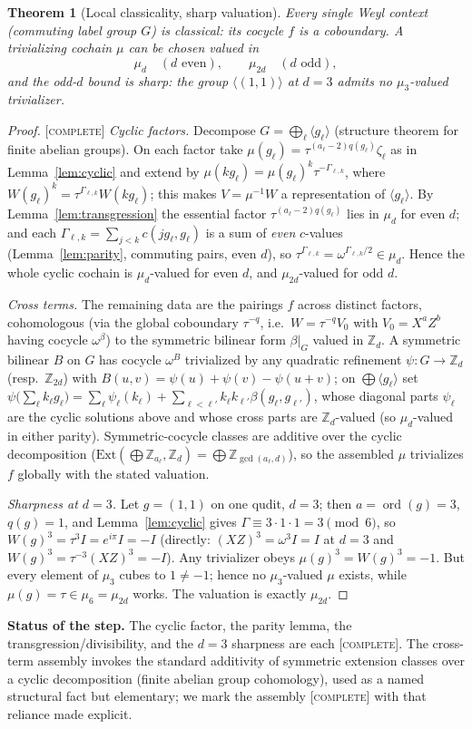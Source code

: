 \documentclass[11pt]{article}
\newtheorem{theorem}{Theorem}
\theoremstyle{definition}
\theoremstyle{remark}
\newcommand{\Z}{\mathbb{Z}}
\newcommand{\Zd}{\Z_d}
\DeclareMathOperator{\ord}{ord}
\newcommand{\CO}{\textnormal{\textsc{[complete]}}}
\newcommand{\flag}[1]{\par\smallskip\noindent\textbf{Status of the step.} #1\par\smallskip}
\begin{document}
\begin{theorem}[Local classicality, sharp valuation]\label{thm:local}
Every single Weyl context (commuting label group $G$) is classical: its cocycle $f$ is a coboundary.
A trivializing cochain $\mu$ can be chosen valued in
\[
\mu_d\quad(d\text{ even}),\qquad\mu_{2d}\quad(d\text{ odd}),
\]
and the odd-$d$ bound is sharp: the group $\langle(1,1)\rangle$ at $d=3$ admits no $\mu_3$-valued
trivializer.
\end{theorem}
\begin{proof}
\CO{} \emph{Cyclic factors.} Decompose $G=\bigoplus_{\ell}\langle g_\ell\rangle$ (structure theorem
for finite abelian groups). On each factor take $\mu(g_\ell)=\tau^{(a_\ell-2)q(g_\ell)}\zeta_\ell$ as
in Lemma~\ref{lem:cyclic} and extend by $\mu(kg_\ell)=\mu(g_\ell)^k\tau^{-\Gamma_{\ell,k}}$, where
$W(g_\ell)^k=\tau^{\Gamma_{\ell,k}}W(kg_\ell)$; this makes $V=\mu^{-1}W$ a representation of
$\langle g_\ell\rangle$. By Lemma~\ref{lem:transgression} the essential factor
$\tau^{(a_\ell-2)q(g_\ell)}$ lies in $\mu_d$ for even $d$; and each $\Gamma_{\ell,k}=\sum_{j<k}
c(jg_\ell,g_\ell)$ is a sum of \emph{even} $c$-values (Lemma~\ref{lem:parity}, commuting pairs, even
$d$), so $\tau^{\Gamma_{\ell,k}}=\omega^{\Gamma_{\ell,k}/2}\in\mu_d$. Hence the whole cyclic cochain is
$\mu_d$-valued for even $d$, and $\mu_{2d}$-valued for odd $d$.

\emph{Cross terms.} The remaining data are the pairings $f$ across distinct factors, cohomologous
(via the global coboundary $\tau^{-q}$, i.e.\ $W=\tau^{-q}V_0$ with $V_0=X^{a}Z^{b}$ having cocycle
$\omega^{\beta}$) to the symmetric bilinear form $\beta|_{G}$ valued in $\Zd$. A symmetric bilinear
$B$ on $G$ has cocycle $\omega^{B}$ trivialized by any quadratic refinement $\psi:G\to\Zd$
(resp.\ $\Z_{2d}$) with $B(u,v)=\psi(u)+\psi(v)-\psi(u+v)$; on $\bigoplus\langle g_\ell\rangle$ set
$\psi\bigl(\sum_\ell k_\ell g_\ell\bigr)=\sum_\ell\psi_\ell(k_\ell)+\sum_{\ell<\ell'}k_\ell k_{\ell'}
\beta(g_\ell,g_{\ell'})$, whose diagonal parts $\psi_\ell$ are the cyclic solutions above and whose
cross parts are $\Zd$-valued (so $\mu_d$-valued in either parity). Symmetric-cocycle classes are
additive over the cyclic decomposition ($\mathrm{Ext}(\bigoplus\Z_{a_\ell},\Zd)=\bigoplus
\Z_{\gcd(a_\ell,d)}$), so the assembled $\mu$ trivializes $f$ globally with the stated valuation.

\emph{Sharpness at $d=3$.} Let $g=(1,1)$ on one qudit, $d=3$; then $a=\ord(g)=3$, $q(g)=1$, and
Lemma~\ref{lem:cyclic} gives $\Gamma\equiv3\cdot1\cdot1=3\pmod6$, so $W(g)^3=\tau^{3}I=e^{i\pi}I=-I$
(directly: $(XZ)^3=\omega^{3}I=I$ at $d=3$ and $W(g)^3=\tau^{-3}(XZ)^3=-I$). Any trivializer obeys
$\mu(g)^3=W(g)^3=-1$. But every element of $\mu_3$ cubes to $1\ne-1$; hence no $\mu_3$-valued $\mu$
exists, while $\mu(g)=\tau\in\mu_6=\mu_{2d}$ works. The valuation is exactly $\mu_{2d}$.
\end{proof}
\flag{The cyclic factor, the parity lemma, the transgression/divisibility, and the $d=3$ sharpness
are each \CO. The cross-term assembly invokes the standard additivity of symmetric extension classes
over a cyclic decomposition (finite abelian group cohomology), used as a named structural fact but
elementary; we mark the assembly \CO{} with that reliance made explicit.}
\end{document}
